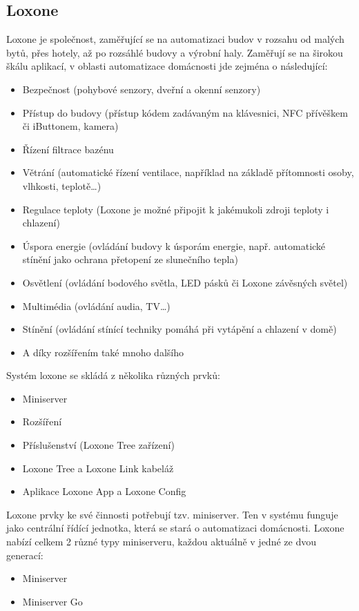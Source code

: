 \subsection*{Loxone}
Loxone je společnost, zaměřující se na automatizaci budov v rozsahu od malých bytů, přes hotely, až po rozsáhlé budovy a výrobní haly. Zaměřují se na širokou škálu aplikací, v oblasti automatizace domácnosti jde zejména o následující:
\begin{itemize}
\item Bezpečnost (pohybové senzory, dveřní a okenní senzory)
\item Přístup do budovy (přístup kódem zadávaným na klávesnici, NFC přívěškem či iButtonem, kamera)
\item Řízení filtrace bazénu
\item Větrání (automatické řízení ventilace, například na základě přítomnosti osoby, vlhkosti, teplotě…)
\item Regulace teploty (Loxone je možné připojit k jakémukoli zdroji teploty i chlazení)
\item Úspora energie (ovládání budovy k úsporám energie, např. automatické stínění jako ochrana přetopení ze slunečního tepla)
\item Osvětlení (ovládání bodového světla, LED pásků či Loxone závěsných světel)
\item Multimédia (ovládání audia, TV…)
\item Stínění (ovládání stínící techniky pomáhá při vytápění a chlazení v domě)
\item A díky rozšířením také mnoho dalšího \cite{ReseniLoxone}
\end{itemize}
Systém loxone se skládá z několika různých prvků:

\begin{itemize}
\item Miniserver
\item Rozšíření
\item Příslušenství (Loxone Tree zařízení)
\item Loxone Tree a Loxone Link kabeláž
\item Aplikace Loxone App a Loxone Config
\end{itemize}

Loxone prvky ke své činnosti potřebují tzv. miniserver. Ten v systému funguje jako centrální řídící jednotka, která se stará o automatizaci domácnosti. Loxone nabízí celkem 2 různé typy miniserveru, každou aktuálně v jedné ze dvou generací:

\begin{itemize}
\item Miniserver
\item Miniserver Go
\end{itemize}

